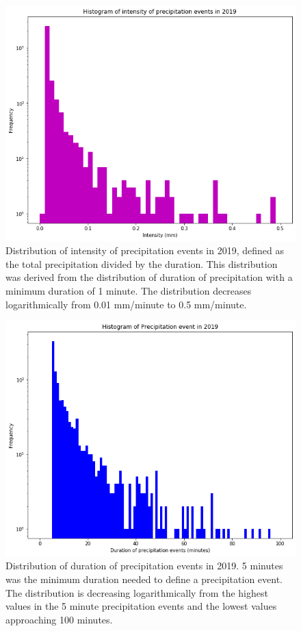\begin{figure}[h]
\centering
\includegraphics[width=150mm]{../Figures/intensity_hist_1min.png}
\caption{\label{abcd}Distribution of intensity of precipitation events in 2019,
defined as the total precipitation divided by the duration. This
distribution was derived from the distribution of duration of
precipitation with a minimum duration of 1 minute. The distribution
decreases logarithmically from 0.01 mm/minute to 0.5 mm/minute.} 
\end{figure}
\vfill
\begin{figure}[h]
\centering\includegraphics[width=150mm]{../Figures/precip_hist_5min.png} 
\caption{\label{abce}Distribution
of duration of precipitation events in 2019. 5 minutes was the minimum
duration needed to define a precipitation event. The distribution is
decreasing logarithmically from the highest values in the 5 minute
precipitation events and the lowest values approaching 100 minutes.}
\end{figure}
